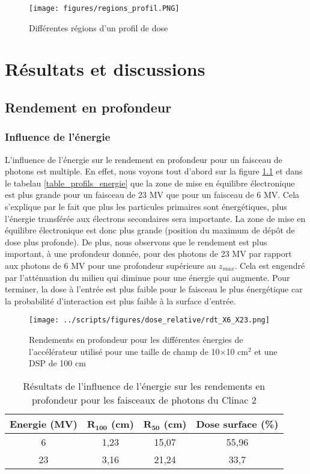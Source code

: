 \documentclass{book}
\begin{document}
\begin{figure}[h]
  \centering
  \texttt{[image: figures/regions\_profil.PNG]}
  \caption{Différentes régions d'un profil de dose}
  \label{fig_regions_profil}
\end{figure}

\chapter{Résultats et discussions}
\section{Rendement en profondeur}
\subsection{Influence de l'énergie}

L'influence de l'énergie sur le rendement en profondeur pour un faisceau de photons est multiple. En effet, nous voyons tout d'abord sur la figure \ref*{fig_rdt_energie} et dans le tabelau \ref*{table_profils_energie} que la zone de mise en équilibre électronique est plus grande pour un faisceau de 23 MV que pour un faisceau de 6 MV. Cela s'explique par le fait que plus les particules primaires sont énergétiques, plus l'énergie transférée aux électrons secondaires sera importante. La zone de mise en équilibre électronique est donc plus grande (position du maximum de dépôt de dose plus profonde). De plus, nous observons que le rendement est plus important, à une profondeur donnée, pour des photons de 23 MV par rapport aux photons de 6 MV pour une profondeur supérieure au $z_{max}$. Cela est engendré par l'atténuation du milieu qui diminue pour une énergie qui augmente. Pour terminer, la dose à l'entrée est plus faible pour le faisceau le plus énergétique car la probabilité d'interaction est plus faible à la surface d'entrée.

\begin{figure}[h!]
  \centering
  \texttt{[image: ../scripts/figures/dose\_relative/rdt\_X6\_X23.png]}
  \caption{Rendements en profondeur pour les différentes énergies de l'accélérateur utilisé pour une taille de champ de 10$\times$10 cm$^2$ et une DSP de 100 cm}
  \label{fig_rdt_energie}
\end{figure}

\begin{table}[h]
  \centering
  \begin{tabular}{cccc}
    \toprule
    \textbf{Energie (MV)} & $\mathbf{R_{100}}$ \textbf{(cm)} & $\mathbf{R_{50}}$ \textbf{(cm)} & \textbf{Dose surface (\%)} \\
    \toprule
    6 & 1,23 & 15,07 & 55,96 \\
    23 & 3,16 & 21,24 & 33,7 \\
    \bottomrule
  \end{tabular}
  \caption{Résultats de l'influence de l'énergie sur les rendements en profondeur pour les faisceaux de photons du Clinac 2}
  \label{table_rdt_energie}
\end{table}
\end{document}
